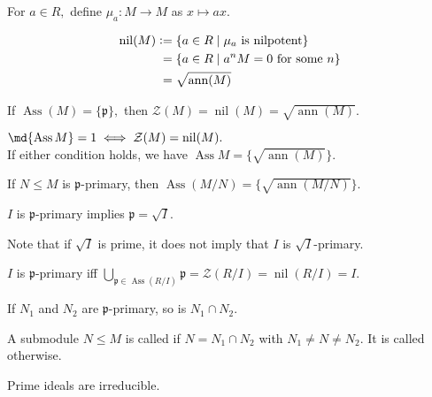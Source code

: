\documentclass[12pt]{article}	%
\DeclareMathOperator{\Ass}{Ass}
\DeclareMathOperator{\ann}{ann}
\DeclareMathOperator{\nil}{nil}
\begin{document}
\begin{defn}%
	For $a \in R,$ define $\mu_a : M \to M$ as $x \mapsto ax.$
\end{defn}

\begin{defn}%
	\begin{align*} 
		\nil(M) \vcentcolon=&\; \{a \in R \mid \mu_a \text{ is nilpotent}\}\\
		=&\; \{a \in R \mid a^nM = 0 \text{ for some } n\}\\
		=&\; \sqrt{\ann(M)}
	\end{align*}
\end{defn}

\begin{prop}
	If $\Ass(M) = \{\mathfrak{p}\},$ then $\mathcal{Z}(M) = \nil(M) = \sqrt{\ann(M)}.$
\end{prop}
\begin{thm}
	$\md{\Ass M} = 1 \iff \mathcal{Z}(M) = \nil(M).$\\
	If either condition holds, we have $\Ass M = \{\sqrt{\ann(M)}\}.$
\end{thm}

\begin{cor}
	If $N \le M$ is $\mathfrak{p}$-primary, then $\Ass(M/N) = \{\sqrt{\ann(M/N)}\}.$
\end{cor}
\begin{cor}
	$I$ is $\mathfrak{p}$-primary implies $\mathfrak{p} = \sqrt{I}.$
\end{cor}
\begin{rem}
	Note that if $\sqrt{I}$ is prime, it does not imply that $I$ is $\sqrt{I}$-primary.
\end{rem}
\begin{cor}
	$I$ is $\mathfrak{p}$-primary iff $\bigcup_{\mathfrak{p} \in \Ass(R/I)}\mathfrak{p} = \mathcal{Z}(R/I) = \nil(R/I) = I.$
\end{cor}

\begin{prop}
	If $N_1$ and $N_2$ are $\mathfrak{p}$-primary, so is $N_1 \cap N_2.$
\end{prop}

\begin{defn}%
	A submodule $N \le M$ is called  if $N = N_1 \cap N_2$ with $N_1 \neq N \neq N_2.$ It is called  otherwise.
\end{defn}
\begin{prop}
	Prime ideals are irreducible.
\end{prop}
\end{document}
